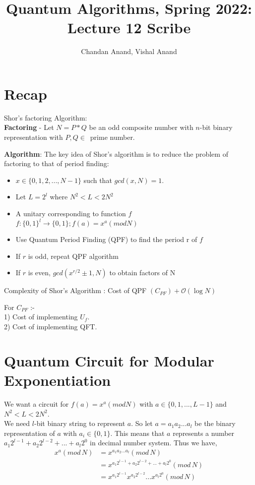 \documentclass[11.5pt, paper=a4]{article}
\title{Quantum Algorithms, Spring 2022: Lecture 12 Scribe}
\author{Chandan Anand, Vishal Anand}
\date{}
\theoremstyle{definition}
\numberwithin{theorem}{section}
\begin{document}
\maketitle

\section*{Recap}

Shor's factoring Algorithm:\\

\noindent \textbf{Factoring} - Let $N=P*Q$ be an odd composite number with $n$-bit binary representation with $P, Q \in \,$ prime number.

\noindent \textbf{Algorithm}: The key idea of Shor's algorithm is to reduce the problem of factoring to that of period finding:
\begin{itemize}
\item $x \in \{0, 1, 2, ..., N-1\}$ such that $gcd(x,N)=1$.
\item Let $L=2^l$ where $N^2 < L < 2N^2$
\item A unitary corresponding to function $f$\\ $f:\{0,1\}^l \to \{0,1\} ; f(a)=x^a(mod N)$
\item Use Quantum Period Finding (QPF) to find the period r of $f$
\item If $r$ is odd, repeat QPF algorithm
\item If $r$ is even, $gcd (x^{r/2} \pm 1, N)$ to obtain factors of N
\end{itemize}
    
\noindent Complexity of Shor's Algorithm : Cost of QPF $(C_{PF}) + \mathcal{O}(\log{}N)$

\noindent For $C_{PF}$ :-\\
1) Cost of implementing $U_f$.\\
2) Cost of implementing QFT.\\

\section*{Quantum Circuit for Modular Exponentiation}

\noindent We want a circuit for $f(a) = x^a (mod N)$ with $a \in \{0, 1, ... ,L-1\}$ and $N^2 < L < 2N^2$.\\
We need $l$-bit binary string to represent $a$. So let $a = a_1 a_2 ... a_l$ be the binary representation of $a$ with $a_i \in \{0, 1\}$.
This means that $a$ represents a number $a_1 2^{l-1} + a_2 2^{l-2} + ... + a_l 2^{0}$ in decimal number system. Thus we have,\\
\begin{equation}
\begin{split}
    x^a (mod\,N) & = x^{a_1 a_2 ... a_l} (mod\,N) \\
    & = x^{a_1 2^{l-1} + a_2 2^{l-2} + ... + a_l 2^{0}} (mod\,N) \\
    & = x^{a_1 2^{l-1}} x^{a_2 2^{l-2}}  ...  x^{a_l 2^{0}} (mod\,N)
\end{split}
\end{equation}
\end{document}
